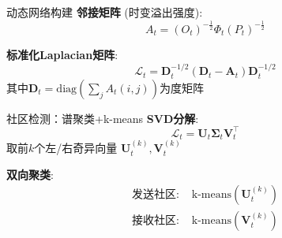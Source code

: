 \documentclass{beamer}
\begin{document}
\begin{frame}{动态网络构建}
\textbf{邻接矩阵} (时变溢出强度):
\begin{equation*}
A_t = (O_t)^{-\frac{1}{2}}\Phi_t(P_t)^{-\frac{1}{2}}
\end{equation*}

\textbf{标准化Laplacian矩阵}:
\begin{equation*}
\mathcal{L}_t = \boldsymbol{D}_t^{-1/2} (\boldsymbol{D}_t - \boldsymbol{A}_t) \boldsymbol{D}_t^{-1/2}
\end{equation*}
其中$\boldsymbol{D}_t = \text{diag}(\sum_j A_t(i,j))$为度矩阵
\end{frame}

\begin{frame}{社区检测：谱聚类+k-means}
\textbf{SVD分解}:
\begin{equation*}
\mathcal{L}_t = \boldsymbol{U}_t \boldsymbol{\Sigma}_t \boldsymbol{V}_t^\top
\end{equation*}
取前$k$个左/右奇异向量 $\boldsymbol{U}_t^{(k)}, \boldsymbol{V}_t^{(k)}$

\textbf{双向聚类}:
\begin{align*}
\text{发送社区: } & \text{k-means}(\boldsymbol{U}_t^{(k)}) \\
\text{接收社区: } & \text{k-means}(\boldsymbol{V}_t^{(k)})
\end{align*}
\end{frame}
\end{document}
